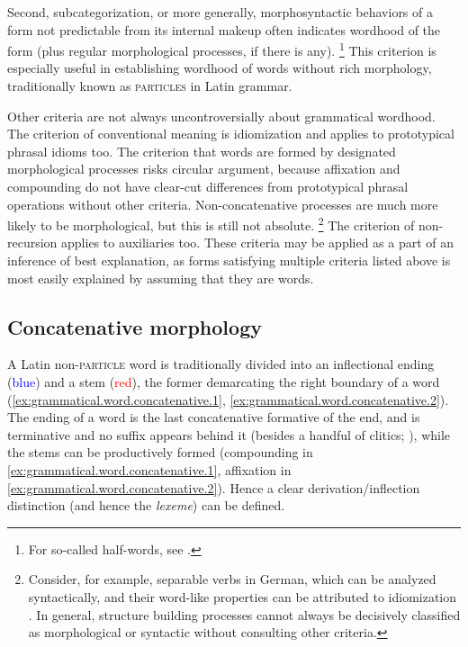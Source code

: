 \documentclass[a4paper, oneside, 12pt]{report}
\newcommand*{\term}[1]{\emph{#1}}
\newcommand*{\category}[1]{\textsc{#1}}
\begin{document}
Second, subcategorization, or more generally, morphosyntactic behaviors of a form not predictable from its internal makeup often indicates wordhood of the form (plus regular morphological processes, if there is any).%
\footnote{
    For so-called half-words, see .
}
This criterion is especially useful in establishing wordhood of words without rich morphology, traditionally known as \category{particles} in Latin grammar. 

Other criteria are not always uncontroversially about grammatical wordhood.
The criterion of conventional meaning is idiomization and applies to prototypical phrasal idioms too.
The criterion that words are formed by designated morphological processes risks circular argument,
because affixation and compounding do not have clear-cut differences from prototypical phrasal operations without other criteria.
Non-concatenative processes are much more likely to be morphological,
but this is still not absolute.%
\footnote{
    Consider, for example, separable verbs in German, 
    which can be analyzed syntactically, and their word-like properties can be attributed to idiomization \citep{wurmbrand2000structure,muller2002complex}.
    In general, structure building processes cannot always be decisively classified as morphological or syntactic without consulting other criteria.
}
The criterion of non-recursion applies to auxiliaries too.
These criteria may be applied as a part of an inference of best explanation,
as forms satisfying multiple criteria listed above is most easily explained by assuming that they are words.



\subsection{Concatenative morphology}\label{sec:grammatical.word.concatenative}

A Latin non-\category{particle} word is traditionally divided into  
an inflectional ending (\textcolor{blue}{blue}) and a stem (\textcolor{red}{red}), the former demarcating the right boundary of a word (\ref{ex:grammatical.word.concatenative.1}, \ref{ex:grammatical.word.concatenative.2}).
The ending of a word is the last concatenative formative of the end,
and is terminative and no suffix appears behind it (besides a handful of clitics; ),
while the stems can be productively formed (compounding in \ref{ex:grammatical.word.concatenative.1}, affixation in \ref{ex:grammatical.word.concatenative.2}).
Hence a clear derivation/inflection distinction (and hence the \term{lexeme}) can be defined.
\end{document}
